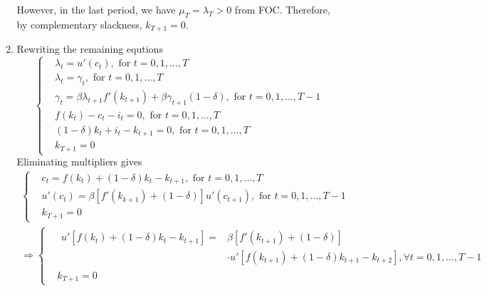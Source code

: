 \documentclass{article}
\begin{document}
\begin{enumerate}
\begin{enumerate}
        However, in the last period, we have $\mu_T=\lambda_T>0$ from FOC. Therefore, by complementary slackness, $k_{T+1}=0$.
        \item Rewriting the remaining equtions
        \begin{equation*}
            \left\{\begin{aligned}
                &\lambda_t={u}'(c_t),\text{ for }t=0,1,\dots,T\\
                &\lambda_t=\gamma_t,\text{ for }t=0,1,\dots,T\\
                &\gamma_t=\beta\lambda_{t+1}{f}'(k_{t+1})+\beta\gamma_{t+1}(1-\delta),\text{ for }t=0,1,\dots,T-1\\
                &f(k_t)-c_t-i_t=0,\text{ for }t=0,1,\dots,T\\
                &(1-\delta)k_t+i_t-k_{t+1}=0,\text{ for }t=0,1,\dots,T\\
                &k_{T+1}=0
            \end{aligned}\right.
        \end{equation*}
        Eliminating multipliers gives
        \begin{gather*}
            \left\{\begin{aligned}
                &c_t=f(k_t)+(1-\delta)k_t-k_{t+1},\text{ for }t=0,1,\dots,T\\
                &{u}'(c_t)=\beta[{f}'(k_{k+1})+(1-\delta)]{u}'(c_{t+1}),\text{ for }t=0,1,\dots,T-1\\
                &k_{T+1}=0
            \end{aligned}\right.\\
            \Rightarrow
            \left\{\begin{aligned}
            &\begin{split}
                {u}'[f(k_t)+(1-\delta)k_t-k_{t+1}]=&\beta[{f}'(k_{t+1})+(1-\delta)]\\
                &\cdot{u}'[f(k_{t+1})+(1-\delta)k_{t+1}-k_{t+2}],\forall t=0,1,\dots,T-1
            \end{split}\\
            &k_{T+1}=0
            \end{aligned}\right.
        \end{gather*}
    \end{enumerate}
\end{enumerate}
\end{document}
